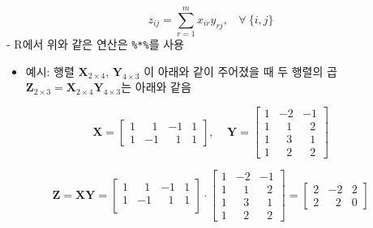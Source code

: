 \documentclass[
  11pt,
]{krantz}
\newenvironment{Shaded}{\begin{snugshade}}{\end{snugshade}}
\newcommand{\DataTypeTok}[1]{\textcolor[rgb]{0.27,0.27,0.27}{#1}}
\newcommand{\DecValTok}[1]{\textcolor[rgb]{0.06,0.06,0.06}{#1}}
\newcommand{\KeywordTok}[1]{\textcolor[rgb]{0.27,0.27,0.27}{\textbf{#1}}}
\newcommand{\NormalTok}[1]{#1}
\newcommand{\OperatorTok}[1]{\textcolor[rgb]{0.43,0.43,0.43}{\textbf{#1}}}
\newcommand{\StringTok}[1]{\textcolor[rgb]{0.5,0.5,0.5}{#1}}
\providecommand{\tightlist}{%
  \setlength{\itemsep}{0pt}\setlength{\parskip}{0pt}}
\begin{document}
\[
 z_{ij} = \sum_{r=1}^{m}x_{ir}y_{rj},~~~~\forall~\{i, j\}
\]
- R에서 위와 같은 연산은 \texttt{\%*\%}를 사용

\begin{itemize}
\tightlist
\item
  예시: 행렬 \(\mathrm{\mathbf X}_{2\times 4}\), \(\mathrm{\mathbf Y}_{4\times 3}\) 이 아래와 같이 주어졌을 때 두 행렬의 곱 \(\mathrm{\mathbf Z}_{2\times 3} = \mathrm{\mathbf{X}}_{2\times 4}\mathrm{\mathbf{Y}}_{4 \times 3}\)는 아래와 같음
\end{itemize}

\[
\mathrm{\mathbf X}=
\begin{bmatrix}
1 &~~~ 1 &   -1 & 1 \\
1 &   -1 &~~~ 1 & 1
\end{bmatrix}, ~~~~~
\mathrm{\mathbf{Y}}=
\begin{bmatrix}
1 &  -2 &  -1 \\
1 &~~~1 &~~~2 \\
1 &~~~3 &~~~1 \\
1 &~~~2 &~~~2
\end{bmatrix}
\]

\[
\mathrm{\mathbf{Z}} = \mathrm{\mathbf{X}}\mathrm{\mathbf{Y}} = 
\begin{bmatrix}
1 &~~~ 1 &   -1 & 1 \\
1 &   -1 &~~~ 1 & 1 \\ 
\end{bmatrix} \cdot  
\begin{bmatrix}
1 &  -2 &  -1 \\
1 &~~~1 &~~~2 \\ 
1 &~~~3 &~~~1 \\
1 &~~~2 &~~~2 
\end{bmatrix} 
 = 
\begin{bmatrix}
2  &  -2 & 2 \\
2  &~~~2 & 0 
\end{bmatrix}
\]

\footnotesize

\begin{Shaded}
\end{Shaded}
\end{document}
